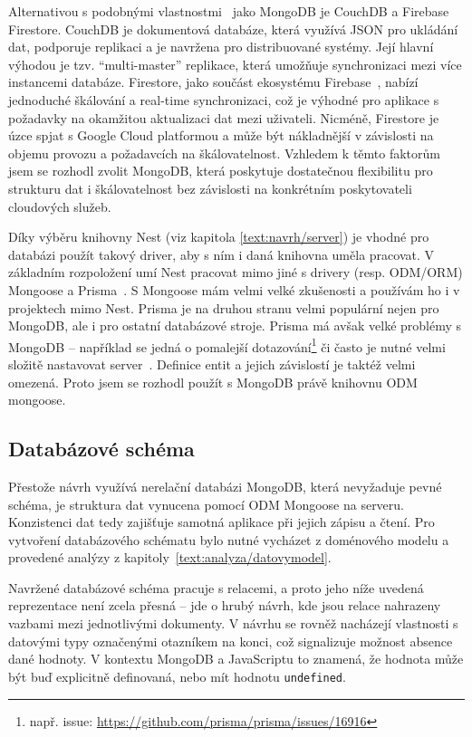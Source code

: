 Alternativou s podobnými vlastnostmi~\cite{irena2015big} jako MongoDB je CouchDB a Firebase Firestore. 
CouchDB je dokumentová databáze, která využívá JSON pro ukládání dat, podporuje replikaci a je navržena pro distribuované systémy. 
Její hlavní výhodou je tzv. \enquote{multi-master} replikace, která umožňuje synchronizaci mezi více instancemi databáze. 
Firestore, jako součást ekosystému Firebase~\cite{firebase}, nabízí jednoduché škálování a real-time synchronizaci, což je výhodné pro aplikace s požadavky na okamžitou aktualizaci dat mezi uživateli. 
Nicméně, Firestore je úzce spjat s Google Cloud platformou a může být nákladnější v závislosti na objemu provozu a požadavcích na škálovatelnost. 
Vzhledem k těmto faktorům jsem se rozhodl zvolit MongoDB, která poskytuje dostatečnou flexibilitu pro strukturu dat i škálovatelnost bez závislosti na konkrétním poskytovateli cloudových služeb.

Díky výběru knihovny Nest (viz kapitola \ref{text:navrh/server}) je vhodné pro databázi použít takový driver, aby s ním i daná knihovna uměla pracovat.
V základním rozpoložení umí Nest pracovat mimo jiné s drivery (resp. ODM/ORM) Mongoose a Prisma~\cite{nest_database}.
S Mongoose mám velmi velké zkušenosti a používám ho i v projektech mimo Nest.
Prisma je na druhou stranu velmi populární nejen pro MongoDB, ale i pro ostatní databázové stroje.
Prisma má avšak velké problémy s MongoDB -- například se jedná o pomalejší dotazování\footnote{např. issue: \url{https://github.com/prisma/prisma/issues/16916}} či často je nutné velmi složitě nastavovat server~\cite{prisma_2025}.
Definice entit a jejich závislostí je taktéž velmi omezená.
Proto jsem se rozhodl použít s MongoDB právě knihovnu ODM mongoose.

\subsection{Databázové schéma}

Přestože návrh využívá nerelační databázi MongoDB, která nevyžaduje pevné schéma, je struktura dat vynucena pomocí ODM Mongoose na serveru.
Konzistenci dat tedy zajišťuje samotná aplikace při jejich zápisu a čtení. 
Pro vytvoření databázového schématu bylo nutné vycházet z doménového modelu a provedené analýzy z kapitoly~\ref{text:analyza/datovymodel}.

Navržené databázové schéma pracuje s relacemi, a proto jeho níže uvedená reprezentace není zcela přesná -- jde o hrubý návrh, kde jsou relace nahrazeny vazbami mezi jednotlivými dokumenty. 
V návrhu se rovněž nacházejí vlastnosti s datovými typy označenými otazníkem na konci, což signalizuje možnost absence dané hodnoty.
V kontextu MongoDB a JavaScriptu to znamená, že hodnota může být buď explicitně definovaná, nebo mít hodnotu \texttt{undefined}.

